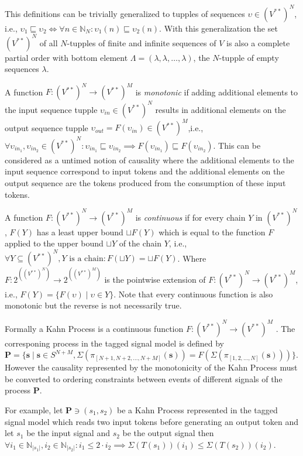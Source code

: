 This definitions can be trivially generalized to tupples of sequences
$\upsilon \in (V^{**})^N$, i.e., $\upsilon_1 \sqsubseteq \upsilon_2 \iff
\forall{n \in \mathbb{N}_N}: \upsilon_1(n) \sqsubseteq \upsilon_2(n)$.
With this generalization the set $(V^{**})^N$ of all $N$-tupples of finite and
infinite sequences of $V$ is also a complete partial order with
bottom element $\Lambda = (\lambda, \lambda, \ldots, \lambda)$, the $N$-tupple
of empty sequences $\lambda$.

A function $F: (V^{**})^N \to (V^{**})^M$ is \emph{monotonic} if
adding additional elements to the input sequence tupple $\upsilon_{in} \in (V^{**})^N$
results in additional elements on the output sequence tupple
$\upsilon_{out} = F(\upsilon_{in}) \in (V^{**})^M$,i.e.,
$\forall{\upsilon_{in_1}, \upsilon_{in_2} \in (V^{**})^N}:
\upsilon_{in_1} \sqsubseteq \upsilon_{in_2} \implies F(\upsilon_{in_1}) \sqsubseteq F(\upsilon_{in_2})$.
This can be considered as a untimed notion of causality
where the additional elements to the input sequence correspond
to input tokens and the additional elements on the output sequence
are the tokens produced from the consumption of these input tokens.

A function $F: (V^{**})^N \to (V^{**})^M$ is \emph{continuous} if
for every chain $Y$ in $(V^{**})^N$, $F(Y)$ has a least upper bound
$\sqcup F(Y)$ which is equal to the function $F$ applied to the
upper bound $\sqcup Y$ of the chain $Y$,
i.e., $\forall{Y \subseteq (V^{**})^N, Y\textrm{ is a chain}}: F(\sqcup Y) = \sqcup F(Y)$.
Where $F : 2^{\left( (V^{**})^N \right)} \to 2^{\left( (V^{**})^M \right)}$
is the pointwise extension of $F : (V^{**})^N \to (V^{**})^M$, i.e.,
$F(Y) = \{ F(\upsilon) \mid \upsilon \in Y\}$. Note that
every continuous function is also monotonic but the reverse
is not necessarily true.

Formally a Kahn Process is a  continuous function $F: (V^{**})^N \to (V^{**})^M$
\cite{kahn:1974,stark87concurrent:1987}.
The corresponing process in the tagged signal model is defined by
$\mathbf{P} = \{ \mathbf{s} \mid \mathbf{s} \in S^{N+M},
  \Sigma(\pi{}_{[N+1,N+2,\ldots,N+M]}(\mathbf{s})) =
  F(\Sigma(\pi{}_{[1,2,\ldots,N]}(\mathbf{s}))) \}$.
However the causality represented by the monotonicity of the
Kahn Process must be converted to ordering constraints
between events of different signals of the process $\mathbf{P}$.

For example, let $\mathbf{P} \ni (s_1,s_2)$ be a Kahn Process
represented in the tagged signal model
which reads two input tokens before generating an output token and
let $s_1$ be the input signal and $s_2$ be the output signal then
$\forall{i_1 \in \mathbb{N}_{|s_1|}, i_2 \in \mathbb{N}_{|s_2|}}: i_1 \le 2 \cdot i_2 \implies \Sigma(T(s_1))(i_1) \le \Sigma(T(s_2))(i_2)$.


